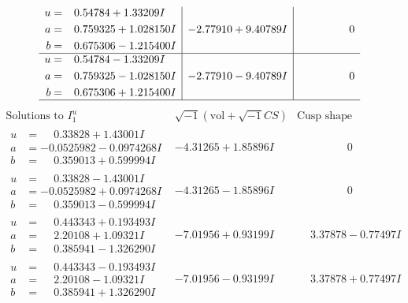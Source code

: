 \documentclass[1p]{elsarticle_modified}
\theoremstyle{definition}
\newcommand{\I}{\sqrt{-1}}
\begin{document}
$$\begin{array}{c|c|c}
\begin{aligned}
u &= \phantom{-}0.54784 + 1.33209 I \\
a &= \phantom{-}0.759325 + 1.028150 I \\
b &= \phantom{-}0.675306 - 1.215400 I\end{aligned}
 & -2.77910 + 9.40789 I & \phantom{-0.000000 } 0 \\ \hline\begin{aligned}
u &= \phantom{-}0.54784 - 1.33209 I \\
a &= \phantom{-}0.759325 - 1.028150 I \\
b &= \phantom{-}0.675306 + 1.215400 I\end{aligned}
 & -2.77910 - 9.40789 I & \phantom{-0.000000 } 0\\
 \hline 
 \end{array}$$\newpage$$\begin{array}{c|c|c}  
\text{Solutions to }I^u_{1}& \I (\text{vol} + \sqrt{-1}CS) & \text{Cusp shape}\\
 \hline 
\begin{aligned}
u &= \phantom{-}0.33828 + 1.43001 I \\
a &= -0.0525982 - 0.0974268 I \\
b &= \phantom{-}0.359013 + 0.599994 I\end{aligned}
 & -4.31265 + 1.85896 I & \phantom{-0.000000 } 0 \\ \hline\begin{aligned}
u &= \phantom{-}0.33828 - 1.43001 I \\
a &= -0.0525982 + 0.0974268 I \\
b &= \phantom{-}0.359013 - 0.599994 I\end{aligned}
 & -4.31265 - 1.85896 I & \phantom{-0.000000 } 0 \\ \hline\begin{aligned}
u &= \phantom{-}0.443343 + 0.193493 I \\
a &= \phantom{-}2.20108 + 1.09321 I \\
b &= \phantom{-}0.385941 - 1.326290 I\end{aligned}
 & -7.01956 + 0.93199 I & \phantom{-}3.37878 - 0.77497 I \\ \hline\begin{aligned}
u &= \phantom{-}0.443343 - 0.193493 I \\
a &= \phantom{-}2.20108 - 1.09321 I \\
b &= \phantom{-}0.385941 + 1.326290 I\end{aligned}
 & -7.01956 - 0.93199 I & \phantom{-}3.37878 + 0.77497 I \\ \hline\begin{aligned}

\end{aligned}
\end{array}$$
\end{document}
